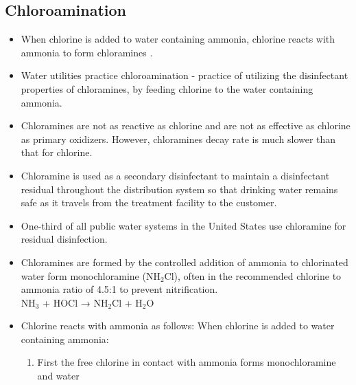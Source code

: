 \subsection{Chloroamination}
			\begin{itemize}
			\item When chlorine is added to water containing ammonia, chlorine reacts with ammonia to form chloramines .
			
\item Water utilities practice chloroamination - practice of utilizing the disinfectant properties of chloramines, by feeding chlorine to the water containing ammonia.
\item Chloramines are not as reactive as chlorine and are not as effective as chlorine as primary oxidizers.  However, chloramines decay rate is much slower than that for chlorine.
\item Chloramine is used as a secondary disinfectant to maintain a disinfectant residual throughout the distribution system so that drinking water remains safe as it travels from the treatment facility to the customer.
\item One-third of all public water systems in the United States use chloramine for residual disinfection.
			
			\item Chloramines are formed by the controlled addition of ammonia to chlorinated water form monochloramine (NH$_2$Cl), often in the recommended chlorine to ammonia ratio of 4.5:1 to prevent nitrification.\\
NH$_3$ + HOCl → NH$_2$Cl + H$_2$O
			
			
			\item Chlorine reacts with ammonia as follows:  When chlorine is added to water containing ammonia:
				\begin{enumerate}
					\item First the free chlorine in contact with ammonia forms monochloramine and water


\end{enumerate}
\end{itemize}
